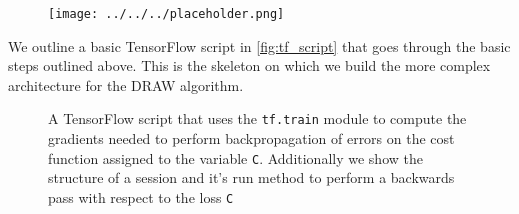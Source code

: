 \begin{figure}[H]
\centering
\texttt{[image: ../../../placeholder.png]}
\caption{}\label{fig:grad_graph}
\end{figure}

We outline a basic TensorFlow script in \ref{fig:tf_script} that goes through the basic steps outlined above. This is the skeleton on which we build the more complex architecture for the DRAW algorithm.

\begin{figure}[H] 
\centering

\caption{A TensorFlow script that uses the \lstinline{tf.train} module to compute the gradients needed to perform backpropagation of errors on the cost function assigned to the variable \lstinline{C}. Additionally we show the structure of a session and it's run method to perform a backwards pass with respect to the loss \lstinline{C}}\label{code:tf_script}
\end{figure}
